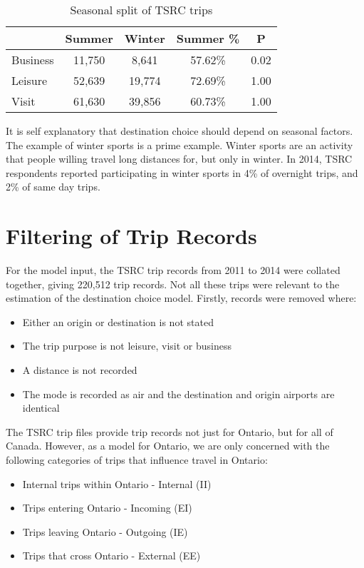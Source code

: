 \begin{table}[H]
\centering
\caption{Seasonal split of TSRC trips}
\label{table:season-split}
\begin{tabular}{p{4.07em}cccc}
\toprule
\multicolumn{1}{r}{} & \multicolumn{1}{p{5em}}{Summer} & \multicolumn{1}{p{4.645em}}{Winter} & \multicolumn{1}{p{3.93em}}{Summer \%} & P  \\ \midrule
Business & 11,750 & 8,641  & 57.62\% & 0.02 \\
Leisure & 52,639 & 19,774 & 72.69\% & 1.00 \\
Visit & 61,630 & 39,856 & 60.73\% & 1.00 \\ \bottomrule
\end{tabular}%

\end{table}


It is self explanatory that destination choice should depend on seasonal factors. The example of winter sports is a prime example. Winter sports are an activity that people willing travel long distances for, but only in winter. In 2014, TSRC respondents reported participating in winter sports in 4\% of overnight trips, and 2\% of same day trips.  

\section{Filtering of Trip Records}
For the model input, the TSRC trip records from 2011 to 2014 were collated together, giving 220,512 trip records. Not all these trips were relevant to the estimation of the destination choice model. Firstly, records were removed where:
\begin{itemize}
\item Either an origin or destination is not stated
\item The trip purpose is not leisure, visit or business
\item A distance is not recorded
\item The mode is recorded as air and the destination and origin airports are identical
\end{itemize}

The TSRC trip files provide trip records not just for Ontario, but for all of Canada. However, as a model for Ontario, we are only concerned with the following categories of trips that influence travel in Ontario:
\begin{itemize}
\item Internal trips within Ontario - Internal (II)
\item Trips entering Ontario - Incoming (EI)
\item Trips leaving Ontario - Outgoing (IE)
\item Trips that cross Ontario - External (EE)
\end{itemize}

